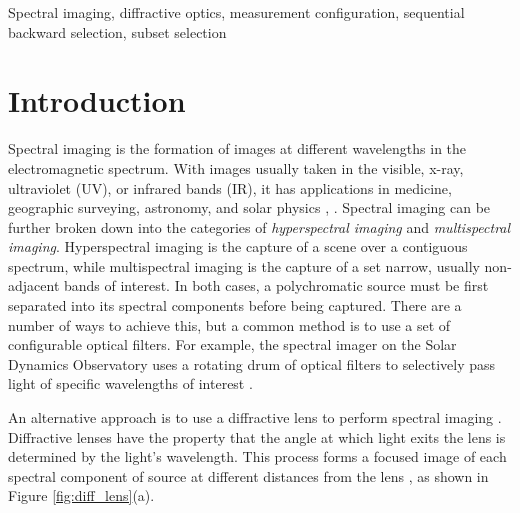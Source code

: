 \documentclass{article}
\begin{document}
\begin{keywords}
Spectral imaging, diffractive optics, measurement configuration, sequential
backward selection, subset selection
\end{keywords}

\section{Introduction}
\label{sec:intro}
Spectral imaging is the formation of images at different wavelengths in the
electromagnetic spectrum. With images usually taken in the visible, x-ray,
ultraviolet (UV), or infrared bands (IR), it has applications in medicine,
geographic surveying, astronomy, and solar physics \cite{shaw2003spectral},
\cite{garini2006spectral}. Spectral imaging can be further broken down into the
categories of \emph{hyperspectral imaging} and \emph{multispectral imaging}.
Hyperspectral imaging is the capture of a scene over a contiguous spectrum,
while multispectral imaging is the capture of a set narrow, usually non-adjacent
bands of interest. In both cases, a polychromatic source must be first separated
into its spectral components before being captured. There are a number of ways
to achieve this, but a common method is to use a set of configurable optical
filters. For example, the spectral imager on the Solar Dynamics Observatory uses
a rotating drum of optical filters to selectively pass light of specific
wavelengths of interest \cite{sdo}.



An alternative approach is to use a diffractive lens to perform spectral imaging
\cite{oktem2014icip}. Diffractive lenses have the property that the angle at
which light exits the lens is determined by the light's wavelength. This process
forms a focused image of each spectral component of source at different
distances from the lens \cite{attwood2017x}, as shown in Figure \ref{fig:diff_lens}(a).
\end{document}
